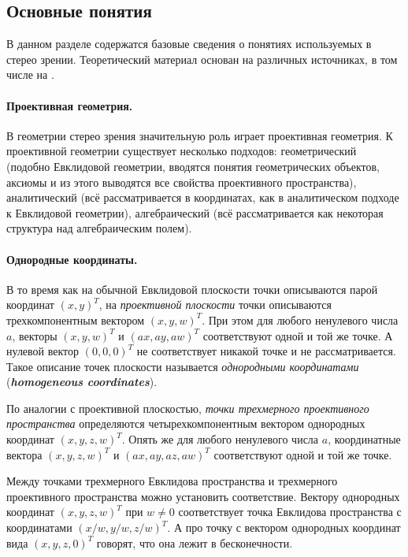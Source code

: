 \documentclass[oneside,final,12pt]{scrartcl}
\begin{document}
		\subsection{Основные понятия}
			В данном разделе содержатся базовые сведения о понятиях используемых в стерео зрении. Теоретический материал основан на различных источниках, в том числе на \cite{Hartley2003, Bradski2008, Alex2004}.

			\paragraph{Проективная геометрия.} В геометрии стерео зрения значительную роль играет проективная геометрия. К проективной геометрии существует несколько подходов: геометрический (подобно Евклидовой геометрии, вводятся понятия геометрических объектов, аксиомы и из этого выводятся все свойства проективного пространства), аналитический (всё рассматривается в координатах, как в аналитическом подходе к Евклидовой геометрии), алгебраический (всё рассматривается как некоторая структура над алгебраическим полем).

			\paragraph{Однородные координаты.} В то время как на обычной Евклидовой плоскости точки описываются парой координат \(\left(x,y\right)^{T}\), на \textit{проективной плоскости} точки описываются трехкомпонентным вектором \(\left(x,y,w\right)^{T}\). При этом для любого ненулевого числа \(a\), векторы \(\left(x,y,w\right)^{T}\) и \(\left(ax,ay,aw\right)^{T}\) соответствуют одной и той же точке. А нулевой вектор \(\left(0,0,0\right)^{T}\) не соответствует никакой точке и не рассматривается. Такое описание точек плоскости называется \textit{однородными координатами} (\textit{\textbf{homogeneous coordinates}}).

			По аналогии с проективной плоскостью, \textit{точки трехмерного проективного пространства} определяются четырехкомпонентным вектором однородных координат  \(\left(x,y,z,w\right)^{T}\). Опять же для любого ненулевого числа \(a\), координатные вектора \(\left(x,y,z,w\right)^{T}\) и \(\left(ax,ay,az,aw\right)^{T}\) соответствуют одной и той же точке.

			Между точками трехмерного Евклидова пространства и трехмерного проективного пространства можно установить соответствие. Вектору однородных координат \(\left(x,y,z,w\right)^{T}\) при \(w \neq 0\) соответствует точка Евклидова пространства с координатами \(\left(x/w,y/w,z/w\right)^{T}\). А про точку с вектором однородных координат вида \(\left(x,y,z,0\right)^{T}\)  говорят, что она лежит в бесконечности.
\end{document}
